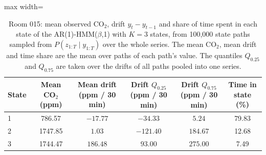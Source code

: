 \begin{table}[ht]
\centering
\begin{adjustbox}{max width=\textwidth}
\begin{tabular}{lccccc}
\hline
State & Mean CO$_2$ (ppm) & Mean drift (ppm / 30 min) & Drift $Q_{0.25}$ (ppm / 30 min) & Drift $Q_{0.75}$ (ppm / 30 min) & Time in state (\%) \\
\hline
1 & 786.57 & $-17.77$ & $-34.33$ & $5.24$ & 79.83 \\
2 & 1747.85 & $1.03$ & $-121.40$ & $184.67$ & 12.68 \\
3 & 1744.47 & $186.48$ & $93.00$ & $275.00$ & 7.49 \\
\hline
\end{tabular}
\end{adjustbox}
\caption{Room 015: mean observed CO$_2$, drift $y_t - y_{t-1}$ and share of time spent in each state of the AR(1)-HMM($\beta$,1) with $K=3$ states, from 100{,}000 state paths sampled from $P(z_{1:T} \mid y_{1:T})$ over the whole series. The mean CO$_2$, mean drift and time share are the mean over paths of each path's value. The quantiles $Q_{0.25}$ and $Q_{0.75}$ are taken over the drifts of all paths pooled into one series.}
\label{tab:state_summary_room_015_calibrated_anchor_ar1_hmm_beta_1_K3}
\end{table}
